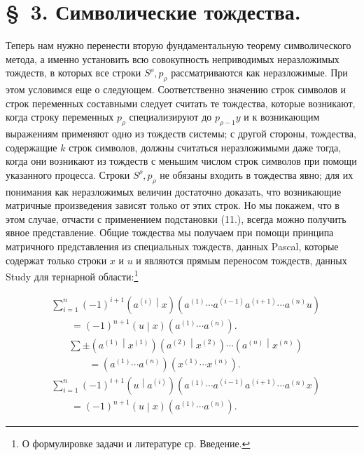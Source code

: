\documentclass[11pt]{article}
\newcommand{\pair}[2]{\left(#1\middle|#2\right)}
\begin{document}
\section*{\S\ 3. Символические тождества.}

Теперь нам нужно перенести вторую фундаментальную теорему символического метода, а именно установить всю совокупность неприводимых неразложимых тождеств, в которых все строки $S^\rho,p_\rho$ рассматриваются как неразложимые. При этом условимся еще о следующем. Соответственно значению строк символов и строк переменных составными следует считать те тождества, которые возникают, когда строку переменных $p_\rho$ специализируют до $p_{\rho-1}y$ и к возникающим выражениям применяют одно из тождеств системы; с другой стороны, тождества, содержащие $k$ строк символов, должны считаться неразложимыми даже тогда, когда они возникают из тождеств с меньшим числом строк символов при помощи указанного процесса. Строки $S^\rho,p_\rho$ не обязаны входить в тождества явно; для их понимания как неразложимых величин достаточно доказать, что возникающие матричные произведения зависят только от этих строк. Но мы покажем, что в этом случае, отчасти с применением подстановки (11.), всегда можно получить явное представление. Общие тождества мы получаем при помощи принципа матричного представления из специальных тождеств, данных Pascal, которые содержат только строки $x$ и $u$ и являются прямым переносом тождеств, данных Study для тернарной области:\footnote{О формулировке задачи и литературе ср. Введение.}

\begin{equation}
\begin{aligned}
&\sum_{i=1}^n(-1)^{i+1}\pair{a^{(i)}}{x}
(a^{(1)}\cdots a^{(i-1)}a^{(i+1)}\cdots a^{(n)}u)\\
&\qquad =(-1)^{n+1}\pair{u}{x}(a^{(1)}\cdots a^{(n)}).
\end{aligned}
\tag{13}
\end{equation}
\begin{equation}
\begin{aligned}
&\sum\pm\pair{a^{(1)}}{x^{(1)}}\pair{a^{(2)}}{x^{(2)}}\cdots
\pair{a^{(n)}}{x^{(n)}}\\
&\qquad=(a^{(1)}\cdots a^{(n)})(x^{(1)}\cdots x^{(n)}).
\end{aligned}
\tag{14}
\end{equation}
\begin{equation}
\begin{aligned}
&\sum_{i=1}^n(-1)^{i+1}\pair{u}{a^{(i)}}
(a^{(1)}\cdots a^{(i-1)}a^{(i+1)}\cdots a^{(n)}x)\\
&\qquad =(-1)^{n+1}\pair{u}{x}(a^{(1)}\cdots a^{(n)}).
\end{aligned}
\tag{15}
\end{equation}
\end{document}
